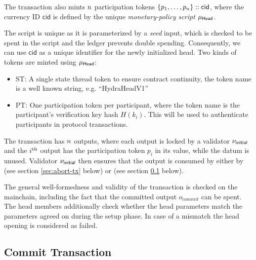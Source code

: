 The \mtxInit{} transaction also mints $n$
participation tokens $\{p_1,\ldots,p_n\} :: \mathsf{cid}$, where the currency
ID $\mathsf{cid}$ is defined by the unique \emph{monetary-policy script}
$\mu_\mathsf{Head}$.

The script is unique as it is parameterized by a \emph{seed} input, which is
checked to be spent in the script  and the ledger
prevents double spending. Consequently, we can use $\mathsf{cid}$ as a unique
identifier for the newly initialized head. Two kinds of tokens are minted using
$\mu_\mathsf{Head}$:
\begin{itemize}
\item ST: A single state thread token to ensure contract continuity, the token name is a well known string, e.g. “HydraHeadV1”
\item PT: One participation token per participant, where the token name is the participant's verification key hash $H(k_i)$. This will be used to authenticate participants in protocol transactions.
\end{itemize}


The \mtxInit{} transaction has $n$ outputs, where each output is
locked by a validator $\nu_\mathsf{initial}$ and the $i^{\text{th}}$ output has the participation
token $p_i$ in its value, while the datum is unused. Validator $\nu_\mathsf{initial}$
then ensures that the output is consumed by either by \mtxAbort{} (see section \ref{sec:abort-tx} below) or \mtxCom{} (see section \ref{sec:commit-tx} below).

The general well-formedness and validity of the \mtxInit{} transaction is
checked on the mainchain, including the fact that the committed output
$o_{commit}$ can be spent. The head members additionally check whether the head
parameters match the parameters agreed on during the setup phase. In case of a
mismatch the head opening is considered as failed.

\subsection{Commit Transaction}\label{sec:commit-tx}



